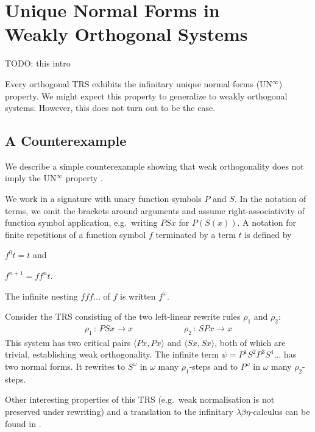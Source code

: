 \chapter[\texorpdfstring{UN$^\infty$ in Weakly Orthogonal Systems}{UN
  in Weakly Orthogonal Systems}]{\texorpdfstring{Unique Normal Forms
    in\\Weakly Orthogonal Systems}{Unique Normal Forms in Weakly
    Orthogonal Systems}}\label{chap:unwo}

TODO: this intro

Every orthogonal TRS exhibits the infinitary unique normal forms
(UN$^\infty$) property. We might expect this property to generalize to
weakly orthogonal systems. However, this does not turn out to be the
case.


\section{A Counterexample}

We describe a simple counterexample showing that weak orthogonality
does not imply the UN$^\infty$ property \citep{endrullis-10}.

We work in a signature with unary function symbols $P$ and $S$. In the
notation of terms, we omit the brackets around arguments and assume
right-associativity of function symbol application, e.g.\ writing
$PSx$ for $P(S(x))$. A notation for finite repetitions of a function
symbol $f$ terminated by a term $t$ is defined by
\begin{inparaenum}[(i)]
\item $f^0 t = t$ and
\item $f^{n+1} = ff^nt$.
\end{inparaenum}
The infinite nesting $fff \ldots$ of $f$ is written $f^\omega$.

Consider the TRS consisting of the two left-linear rewrite rules
$\rho_1$ and $\rho_2$:
\begin{align*}
  \rho_1 \, : \, PSx \to x \qquad \qquad \qquad
  \rho_2 \, : \, SPx \to x
\end{align*}
This system has two critical pairs $\langle Px, Px \rangle$ and
$\langle Sx, Sx \rangle$, both of which are trivial, establishing
weak orthogonality. The infinite term $\psi = P^1 S^2 P^3 S^4 \ldots$
has two normal forms. It rewrites to $S^\omega$ in $\omega$ many
$\rho_1$-steps and to $P^\omega$ in $\omega$ many $\rho_2$-steps.

Other interesting properties of this TRS (e.g.\ weak normalisation is
not preserved under rewriting) and a translation to the infinitary
$\lambda \beta \eta$-calculus can be found in \citet{endrullis-10}.


